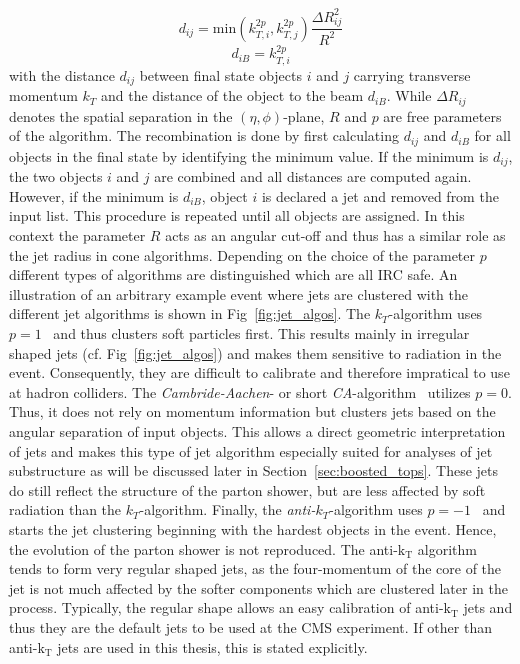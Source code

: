 \begin{description}
\begin{equation*}
d_{ij} = \mathrm{min}(k_{T,i}^{2p}, k_{T,j}^{2p}) \frac{\Delta R_{ij}^2}{R^2}
\end{equation*}
\begin{equation*}
d_{iB} = k_{T,i}^{2p}
\end{equation*}
with the distance $d_{ij}$ between final state objects $i$ and $j$ carrying transverse momentum $k_T$ and the distance of the object to the beam $d_{iB}$. While $\Delta R_{ij}$ denotes the spatial separation in the $(\eta, \phi)$-plane, $R$ and $p$ are free parameters of the algorithm. The recombination is done by first calculating $d_{ij}$ and $d_{iB}$ for all objects in the final state by identifying the minimum value. If the minimum is $d_{ij}$, the two objects $i$ and $j$ are combined and all distances are computed again. However, if the minimum is $d_{iB}$, object $i$ is declared a jet and removed from the input list. This procedure is repeated until all objects are assigned. In this context the parameter $R$ acts as an angular cut-off and thus has a similar role as the jet radius in cone algorithms. Depending on the choice of the parameter $p$ different types of algorithms are distinguished which are all IRC safe. An illustration of an arbitrary example event where jets are clustered with the different jet algorithms is shown in Fig~\ref{fig:jet_algos}. The $k_T$-algorithm uses $p = 1$~\cite{PhysRevD.48.3160} and thus clusters soft particles first. This results mainly in irregular shaped jets (cf. Fig~\ref{fig:jet_algos}) and makes them sensitive to radiation in the event. Consequently, they are difficult to calibrate and therefore impratical to use at hadron colliders. The \textit{Cambride-Aachen}- or short \textit{CA}-algorithm~\cite{Dokshitzer:1997in, Wobisch:1998wt} utilizes $p = 0$. Thus, it does not rely on momentum information but clusters jets based on the angular separation of input objects. This allows a direct geometric interpretation of jets and makes this type of jet algorithm especially suited for analyses of jet substructure as will be discussed later in Section~\ref{sec:boosted_tops}. These jets do still reflect the structure of the parton shower, but are less affected by soft radiation than the $k_T$-algorithm. Finally, the \textit{anti-$k_T$}-algorithm uses $p = -1$~\cite{1126-6708-2008-04-063} and starts the jet clustering beginning with the hardest objects in the event. Hence, the evolution of the parton shower is not reproduced. The anti-$\mathrm{k_T}$ algorithm tends to form very regular shaped jets, as the four-momentum of the core of the jet is not much affected by the softer components which are clustered later in the process. Typically, the regular shape allows an easy calibration of anti-$\mathrm{k_T}$ jets and thus they are the default jets to be used at the CMS experiment. If other than anti-$\mathrm{k_T}$ jets are used in this thesis, this is stated explicitly.
\end{description}

